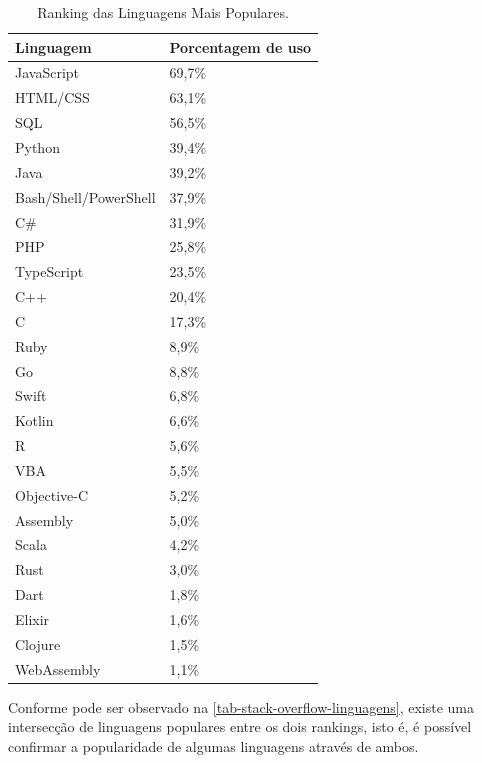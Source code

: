 
\begin{table}[htb]
\ABNTEXfontereduzida
\caption[Ranking das Linguagens Mais Populares]{Ranking das Linguagens Mais Populares.}
\label{tab-stack-overflow-linguagens}
\begin{tabular}{p{5cm}|p{4cm}}
   \textbf{Linguagem} & \textbf{Porcentagem de uso}  \\
    \hline
    JavaScript & 69,7\%  \\
    \hline
    HTML/CSS & 63,1\%  \\
    \hline
    SQL & 56,5\%  \\
    \hline
    Python & 39,4\%  \\
    \hline
    Java & 39,2\%  \\
    \hline
    Bash/Shell/PowerShell & 37,9\%  \\
    \hline
    C\# & 31,9\%  \\
    \hline
    PHP & 25,8\%  \\
    \hline
    TypeScript & 23,5\%  \\
    \hline
    C++ & 20,4\%  \\
    \hline
    C & 17,3\%  \\
    \hline
    Ruby & 8,9\%  \\
    \hline
    Go & 8,8\%  \\
    \hline
    Swift & 6,8\%  \\
    \hline
    Kotlin & 6,6\%  \\
    \hline
    R & 5,6\%  \\
    \hline
    VBA & 5,5\%  \\
    \hline
    Objective-C & 5,2\%  \\
    \hline
    Assembly & 5,0\%  \\
    \hline
    Scala & 4,2\%  \\
    \hline
    Rust & 3,0\%  \\
    \hline
    Dart & 1,8\%  \\
    \hline
    Elixir & 1,6\%  \\
    \hline
    Clojure & 1,5\%  \\
    \hline
    WebAssembly & 1,1\%  \\
\end{tabular}
\end{table}

\newpage
Conforme pode ser observado na \autoref{tab-stack-overflow-linguagens}, existe uma intersecção de linguagens populares entre os dois rankings, isto é, é possível confirmar a popularidade de algumas linguagens através de ambos.

